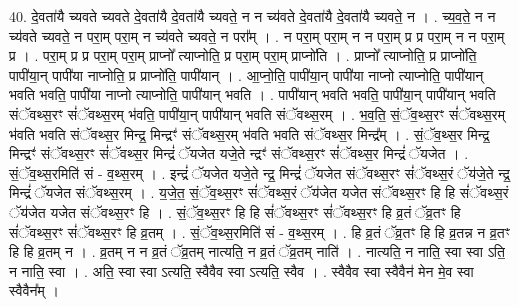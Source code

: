 \documentclass[17pt]{extarticle}
\begin{document}
40. दे॒वता॑यै च्यवते च्यवते दे॒वता॑यै दे॒वता॑यै च्यवते॒ न न च्य॑वते दे॒वता॑यै दे॒वता॑यै च्यवते॒ न । . च्य॒व॒ते॒ न न च्य॑वते च्यवते॒ न परा॒म् परा॒म् न च्य॑वते च्यवते॒ न परा᳚म् । . न परा॒म् परा॒म् न न परा॒म् प्र प्र परा॒म् न न परा॒म् प्र । . परा॒म् प्र प्र परा॒म् परा॒म् प्राप्नो᳚ त्याप्नोति॒ प्र परा॒म् परा॒म् प्राप्नो॑ति । . प्राप्नो᳚ त्याप्नोति॒ प्र प्राप्नो॑ति॒ पापी॑या॒न् पापी॑या नाप्नोति॒ प्र प्राप्नो॑ति॒ पापी॑यान् । . आ॒प्नो॒ति॒ पापी॑या॒न् पापी॑या नाप्नो त्याप्नोति॒ पापी॑यान् भवति भवति॒ पापी॑या नाप्नो त्याप्नोति॒ पापी॑यान् भवति । . पापी॑यान् भवति भवति॒ पापी॑या॒न् पापी॑यान् भवति संॅवथ्स॒रꣳ सं॑ॅवथ्स॒रम् भ॑वति॒ पापी॑या॒न् पापी॑यान् भवति संॅवथ्स॒रम् । . भ॒व॒ति॒ सं॒ॅव॒थ्स॒रꣳ सं॑ॅवथ्स॒रम् भ॑वति भवति संॅवथ्स॒र मिन्द्र॒ मिन्द्रꣳ॑ संॅवथ्स॒रम् भ॑वति भवति संॅवथ्स॒र मिन्द्र᳚म् । . सं॒ॅव॒थ्स॒र मिन्द्र॒ मिन्द्रꣳ॑ संॅवथ्स॒रꣳ सं॑ॅवथ्स॒र मिन्द्रं॑ ॅयजेत यजे॒ते न्द्रꣳ॑ संॅवथ्स॒रꣳ सं॑ॅवथ्स॒र मिन्द्रं॑ ॅयजेत । . सं॒ॅव॒थ्स॒रमिति॑ सं - व॒थ्स॒रम् । . इन्द्रं॑ ॅयजेत यजे॒ते न्द्र॒ मिन्द्रं॑ ॅयजेत संॅवथ्स॒रꣳ सं॑ॅवथ्स॒रं ॅय॑जे॒ते न्द्र॒ मिन्द्रं॑ ॅयजेत संॅवथ्स॒रम् । . य॒जे॒त॒ सं॒ॅव॒थ्स॒रꣳ सं॑ॅवथ्स॒रं ॅय॑जेत यजेत संॅवथ्स॒रꣳ हि हि सं॑ॅवथ्स॒रं ॅय॑जेत यजेत संॅवथ्स॒रꣳ हि । . सं॒ॅव॒थ्स॒रꣳ हि हि सं॑ॅवथ्स॒रꣳ सं॑ॅवथ्स॒रꣳ हि व्र॒तं ॅव्र॒तꣳ हि सं॑ॅवथ्स॒रꣳ सं॑ॅवथ्स॒रꣳ हि व्र॒तम् । . सं॒ॅव॒थ्स॒रमिति॑ सं - व॒थ्स॒रम् । . हि व्र॒तं ॅव्र॒तꣳ हि हि व्र॒तन्न न व्र॒तꣳ हि हि व्र॒तम् न । . व्र॒तम् न न व्र॒तं ॅव्र॒तम् नात्यति॒ न व्र॒तं ॅव्र॒तम् नाति॑ । . नात्यति॒ न नाति॒ स्वा स्वा ऽति॒ न नाति॒ स्वा । . अति॒ स्वा स्वा ऽत्यति॒ स्वैवैव स्वा ऽत्यति॒ स्वैव । . स्वैवैव स्वा स्वैवैन॑ मेन मे॒व स्वा स्वैवैन᳚म् । \newline
\pagebreak
{}
\end{document}

